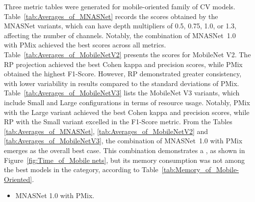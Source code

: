 Three metric tables were generated for mobile-oriented family of \gls{CV} models.
Table~\ref{tab:Averages_of_MNASNet} records the scores obtained by the MNASNet variants, which can have depth multipliers of 0.5, 0.75, 1.0, or 1.3, affecting the number of channels. Notably, the combination of \mbox{MNASNet 1.0} with \gls{PMix} achieved the best scores across all metrics.
Table~\ref{tab:Averages_of_MobileNetV2} presents the scores for MobileNet V2. The \gls{RP} projection achieved the best Cohen kappa and precision scores, while \gls{PMix} obtained the highest F1-Score. However, \gls{RP} demonstrated greater consistency, with lower variability in results compared to the standard deviations of \gls{PMix}.
Table~\ref{tab:Averages_of_MobileNetV3} lists the MobileNet V3 variants, which include Small and Large configurations in terms of resource usage. Notably, \gls{PMix} with the Large variant achieved the best Cohen kappa and precision scores, while \gls{RP} with the Small variant excelled in the F1-Score metric.
From the Tables \ref{tab:Averages_of_MNASNet}, \ref{tab:Averages_of_MobileNetV2} and \ref{tab:Averages_of_MobileNetV3}, the combination of \mbox{MNASNet 1.0} with \gls{PMix} emerges as the overall best case. This combination demonstrates a , as shown in Figure~\ref{fig:Time_of_Mobile nets}, but its memory consumption was not among the best models in the category, according to Table~\ref{tab:Memory_of_Mobile-Oriented}.  
\begin{itemize}
	\item MNASNet 1.0 with \gls{PMix}.
\end{itemize}


